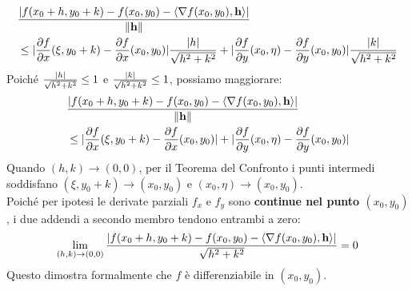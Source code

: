 \begin{dimostrazione}
\begin{align*}
&\frac{\lvert f(x_0 + h, y_0 + k) - f(x_0, y_0) - \langle\nabla f(x_0, y_0), \mathbf{h}\rangle\rvert}{\lVert\mathbf{h}\rVert} \\
&\le \lvert\frac{\partial f}{\partial x}(\xi, y_0 + k) - \frac{\partial f}{\partial x}(x_0, y_0)\rvert \frac{\lvert h\rvert}{\sqrt{h^2+k^2}} + \lvert\frac{\partial f}{\partial y}(x_0, \eta) - \frac{\partial f}{\partial y}(x_0, y_0)\rvert \frac{\lvert k\rvert}{\sqrt{h^2+k^2}}
\end{align*}
Poiché $\frac{\lvert h\rvert}{\sqrt{h^2+k^2}} \le 1$ e $\frac{\lvert k\rvert}{\sqrt{h^2+k^2}} \le 1$, possiamo maggiorare:
\begin{align*}
&\frac{\lvert f(x_0 + h, y_0 + k) - f(x_0, y_0) - \langle\nabla f(x_0, y_0), \mathbf{h}\rangle\rvert}{\lVert\mathbf{h}\rVert} \\
&\le \lvert\frac{\partial f}{\partial x}(\xi, y_0 + k) - \frac{\partial f}{\partial x}(x_0, y_0)\rvert + \lvert\frac{\partial f}{\partial y}(x_0, \eta) - \frac{\partial f}{\partial y}(x_0, y_0)\rvert
\end{align*}
Quando $(h, k) \to (0, 0)$, per il Teorema del Confronto i punti intermedi soddisfano $(\xi, y_0+k) \to (x_0, y_0)$ e $(x_0, \eta) \to (x_0, y_0)$.\\
Poiché per ipotesi le derivate parziali $f_x$ e $f_y$ sono \textbf{continue nel punto $(x_0, y_0)$}, i due addendi a secondo membro tendono entrambi a zero:
\[
\lim_{(h,k) \to (0,0)} \frac{\lvert f(x_0 + h, y_0 + k) - f(x_0, y_0) - \langle\nabla f(x_0, y_0), \mathbf{h}\rangle\rvert}{\sqrt{h^2+k^2}} = 0
\]
Questo dimostra formalmente che $f$ è differenziabile in $(x_0, y_0)$.
\end{dimostrazione}

